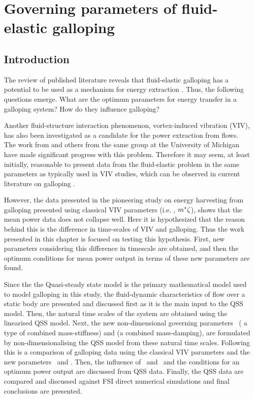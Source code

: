 \chapter{Governing parameters of fluid-elastic galloping}
\label{chap:pi_1_pi2}
\section{Introduction}

The review of published literature reveals that fluid-elastic galloping has a potential to be used as a mechanism for energy extraction \citep{Barrero-Gil2010a}. Thus, the following questions emerge. What are the optimum parameters for energy transfer in a galloping system? How do they influence galloping?

Another fluid-structure interaction phenomenon, vortex-induced vibration (VIV), has also been investigated as a candidate for the power extraction from flows. The work from \citet{Bernitsas2008a-concept, Bernitsas2009, Raghavan2010a, Lee2011b} and others from the same group at the University of Michigan have made significant progress with this problem. Therefore it may seem, at least initially, reasonable to present data from the fluid-elastic problem in the same parameters as typically used in VIV studies, which can be observed in current literature on galloping \citep{Barrero-Gil2009,Barrero-Gil2010a,Parkinson1964}.



However, the data presented in the pioneering study on energy harvesting from galloping  \citep{Barrero-Gil2010a} presented using classical VIV parameters (i.e. \ustar, $m^{*}\zeta$), shows that the mean power data does not collapse well. Here it is hypothesized that the reason behind this is the difference in time-scales of VIV and galloping. Thus the work presented in this chapter is focused on testing this hypothesis. First, new parameters considering this difference in timescale are obtained, and then the optimum conditions for mean power output in terms of these new parameters are found. 

Since the the Quasi-steady state model is the primary mathematical model used to model galloping in this study, the fluid-dynamic characteristics of flow over a static body are presented and discussed first as it is the main input to the QSS model. Then, the natural time scales of the system are obtained using the linearised QSS model. Next, the new non-dimensional governing parameters  \massstiff\ ( a type of combined mass-stiffness) and \massdamp (a combined mass-damping), are formulated by non-dimensionalising the QSS model from these natural time scales. Following this is a comparison of galloping data using the classical VIV parameters and the new parameters \massstiff\ and \massdamp. Then, the influence of \massstiff \ and \massdamp \ and the conditions for an optimum power output are discussed from QSS data. Finally, the QSS data are compared and discussed against FSI direct numerical simulations and final conclusions are presented.

